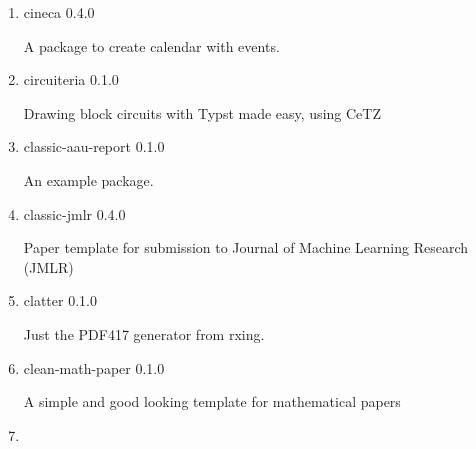 \begin{enumerate}

  { chuli-cv } { 0.1.0 }

  Minimalistic and modern CV and cover letter templates.
\item
  \href{/universe/package/cineca/}{}

  { cineca } { 0.4.0 }

  A package to create calendar with events.
\item
  \href{/universe/package/circuiteria/}{}

  { circuiteria } { 0.1.0 }

  Drawing block circuits with Typst made easy, using CeTZ
\item
  \href{/universe/package/classic-aau-report/}{}


  { classic-aau-report } { 0.1.0 }

  An example package.
\item
  \href{/universe/package/classic-jmlr/}{}


  { classic-jmlr } { 0.4.0 }

  Paper template for submission to Journal of Machine Learning Research
  (JMLR)
\item
  \href{/universe/package/clatter/}{}

  { clatter } { 0.1.0 }

  Just the PDF417 generator from rxing.
\item
  \href{/universe/package/clean-math-paper/}{}


  { clean-math-paper } { 0.1.0 }

  A simple and good looking template for mathematical papers
\item
  \href{/universe/package/clean-math-presentation/}{}



\end{enumerate}
